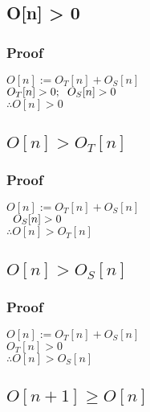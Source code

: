 \documentclass[11pt]{article}
\begin{document}
\subsection{O[n] > 0}
\subsubsection{Proof}
\begin{center}
$
O[n] := O_T[n] + O_S[n]
$
\\ \vspace{3mm}
$
O_T[n] > 0; \hspace{2mm} O_S[n] > 0
$
\\ \vspace{3mm}
$
\therefore O[n] > 0
$
\end{center}

\subsection{$O[n] > O_T[n]$}
\subsubsection{Proof}
\begin{center}
$
O[n] := O_T[n] + O_S[n]
$
\\ \vspace{3mm}
$
\hspace{2mm} O_S[n] > 0
$
\\ \vspace{3mm}
$
\therefore O[n] > O_T[n]
$
\end{center}

\subsection{$O[n] > O_S[n]$}
\subsubsection{Proof}
\begin{center}
$
O[n] := O_T[n] + O_S[n]
$
\\ \vspace{3mm}
$
O_T[n] > 0
$
\\ \vspace{3mm}
$
\therefore O[n] > O_S[n]
$
\end{center}


\subsection{$O[n+1] \geq O[n]$}
\end{document}
